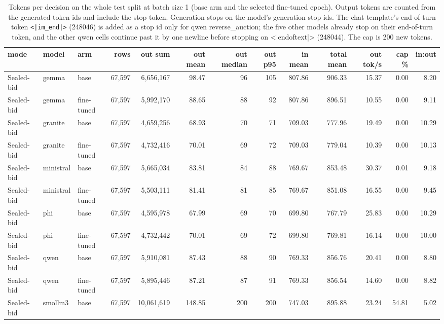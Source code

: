 \begin{table}[t]
\centering
\small
\caption{Tokens per decision on the whole test split at batch size 1 (base arm and the selected fine-tuned epoch). Output tokens are counted from the generated token ids and include the stop token. Generation stops on the model's generation stop ids. The chat template's end-of-turn token \texttt{<|im\_end|>} (248046) is added as a stop id only for qwen reverse\_auction; the five other models already stop on their end-of-turn token, and the other qwen cells continue past it by one newline before stopping on <|endoftext|> (248044). The cap is 200 new tokens.}
\label{tab:tokens}
\begin{tabular}{lllrrrrrrrrrr}
\toprule
mode & model & arm & rows & \textbf{out sum} & \textbf{out mean} & \textbf{out median} & \textbf{out p95} & in mean & total mean & \textbf{out tok/s} & cap \% & in:out \\
\midrule
Sealed-bid & gemma & base & 67,597 & 6,656,167 & 98.47 & 96 & 105 & 807.86 & 906.33 & 15.37 & 0.00 & 8.20 \\
Sealed-bid & gemma & fine-tuned & 67,597 & 5,992,170 & 88.65 & 88 & 92 & 807.86 & 896.51 & 10.55 & 0.00 & 9.11 \\
Sealed-bid & granite & base & 67,597 & 4,659,256 & 68.93 & 70 & 71 & 709.03 & 777.96 & 19.49 & 0.00 & 10.29 \\
Sealed-bid & granite & fine-tuned & 67,597 & 4,732,416 & 70.01 & 69 & 72 & 709.03 & 779.04 & 10.39 & 0.00 & 10.13 \\
Sealed-bid & ministral & base & 67,597 & 5,665,034 & 83.81 & 84 & 88 & 769.67 & 853.48 & 30.37 & 0.01 & 9.18 \\
Sealed-bid & ministral & fine-tuned & 67,597 & 5,503,111 & 81.41 & 81 & 85 & 769.67 & 851.08 & 16.55 & 0.00 & 9.45 \\
Sealed-bid & phi & base & 67,597 & 4,595,978 & 67.99 & 69 & 70 & 699.80 & 767.79 & 25.83 & 0.00 & 10.29 \\
Sealed-bid & phi & fine-tuned & 67,597 & 4,732,442 & 70.01 & 69 & 72 & 699.80 & 769.81 & 16.14 & 0.00 & 10.00 \\
Sealed-bid & qwen & base & 67,597 & 5,910,081 & 87.43 & 88 & 90 & 769.33 & 856.76 & 20.41 & 0.00 & 8.80 \\
Sealed-bid & qwen & fine-tuned & 67,597 & 5,895,446 & 87.21 & 87 & 91 & 769.33 & 856.54 & 14.60 & 0.00 & 8.82 \\
Sealed-bid & smollm3 & base & 67,597 & 10,061,619 & 148.85 & 200 & 200 & 747.03 & 895.88 & 23.24 & 54.81 & 5.02 \\

\end{tabular}
\end{table}

